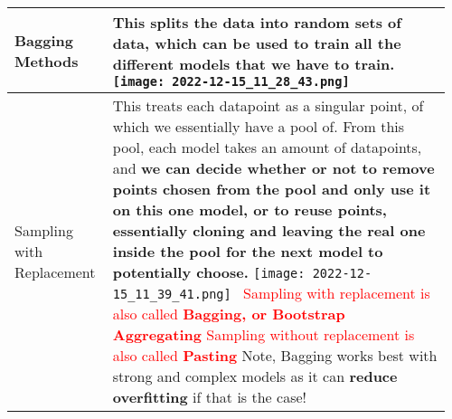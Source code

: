 \documentclass[main.tex,fontsize=8pt,paper=a4,paper=portrait,DIV=calc,]{scrartcl}
\begin{document}
\begin{table}[ht!]
\begin{tabular}{|m{0.2\linewidth}|m{0.755\linewidth}|}
\\
\hline
Bagging Methods & 
This splits the data into random sets of data, which can be used to train all the different models that we have to train.\newline
\texttt{[image: 2022-12-15\_11\_28\_43.png]}\\
\hline
Sampling with Replacement & 
This treats each datapoint as a singular point, of which we essentially have a pool of. From this pool, each model takes an amount of datapoints, and \textbf{we can decide whether or not to remove points chosen from the pool and only use it on this one model, or to reuse points, essentially cloning and leaving the real one inside the pool for the next model to potentially choose.}\newline
\texttt{[image: 2022-12-15\_11\_39\_41.png]} \, \newline
\textcolor{red}{Sampling with replacement is also called \textbf{Bagging, or Bootstrap Aggregating}}\newline
\textcolor{red}{Sampling without replacement is also called \textbf{Pasting}} \newline 
Note, Bagging works best with strong and complex models as it can \textbf{reduce overfitting} if that is the case!\\
\hline

\hline
\end{tabular}
\end{table}
\pagebreak
\end{document}
